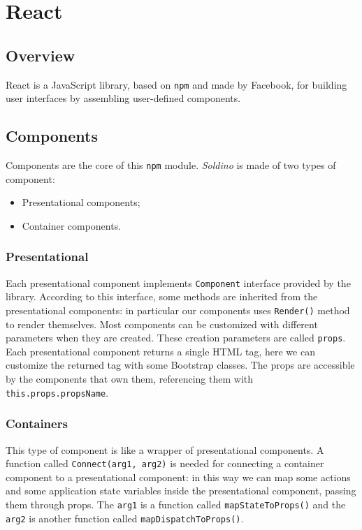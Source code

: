\section{React} 

\subsection{Overview}
React is a JavaScript library, based on \texttt{npm} and made by Facebook, for building user interfaces by assembling user-defined components.
\subsection{Components}
Components are the core of this \texttt{npm} module. \textit{Soldino} is made of two types of component:
\begin{itemize}
	\item Presentational components;
	\item Container components.
\end{itemize}
\subsubsection{Presentational}
Each presentational component implements \texttt{Component} interface provided by the library. According to this interface, some methods are inherited from the presentational components: in particular our components uses \texttt{Render()} method to render themselves.
Most components can be customized with different parameters when they are created. These creation parameters are called \texttt{props}. Each presentational component returns a single HTML tag, here we can customize the returned tag with some Bootstrap classes. The props are accessible by the components that own them, referencing them with \texttt{this.props.propsName}.

\subsubsection{Containers} 
This type of component is like a wrapper of presentational components. A function called \texttt{Connect(arg1, arg2)} is needed for connecting a container component to a presentational component: in this way we can map some actions and some application state variables inside the presentational component, passing them through props. The \texttt{arg1} is a function called \texttt{mapStateToProps()} and the \texttt{arg2} is another function called \texttt{mapDispatchToProps()}.

